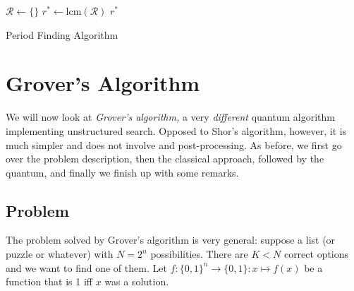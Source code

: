 			\begin{algorithm}  \DontPrintSemicolon
				\( \mathcal{R} \gets \{ \} \)  \quad{}
				\( r^\ast \gets \mathrm{lcm}(\mathcal{R}) \)  \quad{}
				\Return \( r^\ast \) \;
				\caption{Period Finding Algorithm}
				\label{alg:period}
			\end{algorithm}

	\section{Grover's Algorithm}
		\label{sec:grovers}

		We will now look at \emph{Grover's algorithm,} a very \emph{different} quantum algorithm implementing unstructured search. Opposed to Shor's algorithm, however, it is much simpler and does not involve and post-processing. As before, we first go over the problem description, then the classical approach, followed by the quantum, and finally we finish up with some remarks.

		\subsection{Problem}
			The problem solved by Grover's algorithm is very general: suppose a list (or puzzle or whatever) with \( N = 2^n \) possibilities. There are \(K < N\) correct options and we want to find one of them. Let \( f : \{ 0, 1 \}^n \to \{ 0, 1 \} : x \mapsto f(x) \) be a function that is \num{1} iff \(x\) was a solution.

